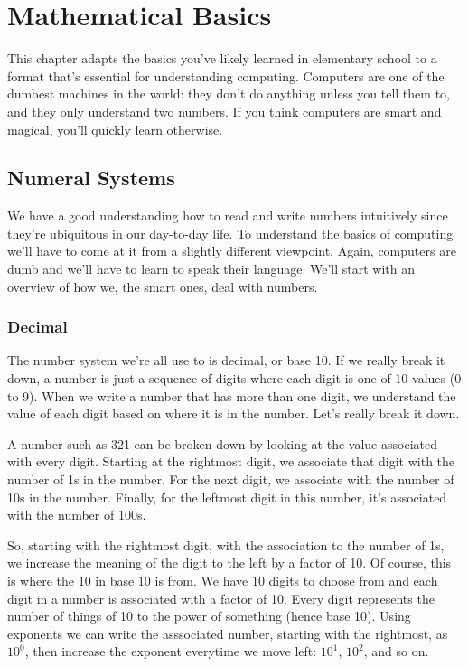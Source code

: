 \chapter{Mathematical Basics}

This chapter adapts the basics you've likely learned in elementary school to a
format that's essential for understanding computing. Computers are one of the
dumbest machines in the world: they don't do anything unless you tell them to,
and they only understand two numbers. If you think computers are smart and
magical, you'll quickly learn otherwise.

\section{Numeral Systems}

We have a good understanding how to read and write numbers intuitively since
they're ubiquitous in our day-to-day life. To understand the basics of computing
we'll have to come at it from a slightly different viewpoint. Again, computers
are dumb and we'll have to learn to speak their language. We'll start with an
overview of how we, the smart ones, deal with numbers.

\subsection{Decimal}

The number system we're all use to is decimal, or base 10. If we really break it
down, a number is just a sequence of digits where each digit is one of 10 values
(0 to 9). When we write a number that has more than one digit, we understand the
value of each digit based on where it is in the number. Let's really break it
down.

A number such as 321 can be broken down by looking at the value associated with
every digit. Starting at the rightmost digit, we associate that digit with the
number of 1s in the number. For the next digit, we associate with the number of
10s in the number. Finally, for the leftmost digit in this number, it's
associated with the number of 100s.

So, starting with the rightmost digit, with the association to the number of 1s,
we increase the meaning of the digit to the left by a factor of 10. Of course,
this is where the 10 in base 10 is from. We have 10 digits to choose from and
each digit in a number is associated with a factor of 10. Every digit represents
the number of things of 10 to the power of something (hence base 10). Using
exponents we can write the asssociated number, starting with the rightmost, as
$10^0$, then increase the exponent everytime we move left: $10^1$, $10^2$, and
so on.

